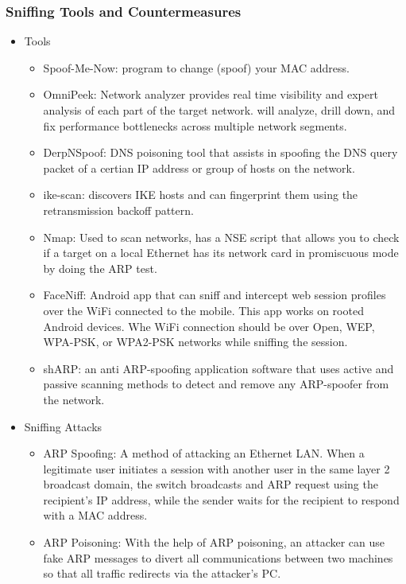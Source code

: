 \subsubsection{Sniffing Tools and Countermeasures}
\begin{itemize}
    \item Tools
    \begin{itemize}
        \item Spoof-Me-Now: program to change (spoof) your MAC address.
        \item OmniPeek: Network analyzer provides real time visibility and expert analysis of each part of the target network. will analyze, drill down, and fix performance bottlenecks across multiple network segments.
        \item DerpNSpoof: DNS poisoning tool that assists in spoofing the DNS query packet of a certian IP address or group of hosts on the network.
        \item ike-scan: discovers IKE hosts and can fingerprint them using the retransmission backoff pattern.
        \item Nmap: Used to scan networks, has a NSE script that allows you to check if a target on a local Ethernet has its network card in promiscuous mode by doing the ARP test.
        \item FaceNiff: Android app that can sniff and intercept web session profiles over the WiFi connected to the mobile. This app works on rooted Android devices. Whe WiFi connection should be over Open, WEP, WPA-PSK, or WPA2-PSK networks while sniffing the session.
        \item shARP: an anti ARP-spoofing application software that uses active and passive scanning methods to detect and remove any ARP-spoofer from the network.
    \end{itemize}
    \item Sniffing Attacks
    \begin{itemize}
        \item ARP Spoofing: A method of attacking an Ethernet LAN. When a legitimate user initiates a session with another user in the same layer 2 broadcast domain, the switch broadcasts and ARP request using the recipient's IP address, while the sender waits for the recipient to respond with a MAC address.
        \item ARP Poisoning: With the help of ARP poisoning, an attacker can use fake ARP messages to divert all communications between two machines so that all traffic redirects via the attacker's PC.

\end{itemize}
\end{itemize}
